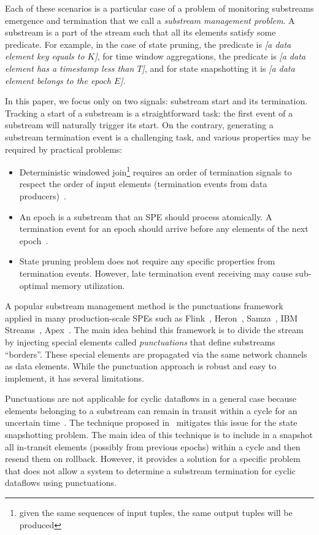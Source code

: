 Each of these scenarios is a particular case of a problem of monitoring substreams emergence and termination that we call a {\em substream management problem}. A substream is a part of the stream such that all its elements satisfy some predicate. 
For example, in the case of state pruning, the predicate is {\em [a data element key equals to $K$]}, for time window aggregations, the predicate is {\em [a data element has a timestamp less than $T$]}, and for state snapshotting it is {\em [a data element belongs to the epoch $E$]}.

In this paper, we focus only on two signals: substream start and its termination. Tracking a start of a substream is a straightforward task: the first event of a substream will naturally trigger its start. On the contrary, generating a substream termination event is a challenging task, and various properties may be required by practical problems:
\begin{itemize}
    \item Deterministic windowed join\footnote{given the same sequences of input tuples, the same output tuples will be produced} requires an order of termination signals to respect the order of input elements (termination events from data producers)~\cite{najdataei2019stretch, gulisano2016scalejoin}.
    \item An epoch is a substream that an SPE should process atomically. A termination event for an epoch should arrive before any elements of the next epoch~\cite{2015arXiv150608603C}.
    \item State pruning problem does not require any specific properties from termination events. However, late termination event receiving may cause sub-optimal memory utilization.
\end{itemize}

A popular substream management method is the punctuations framework~\cite{tucker2003exploiting} applied in many production-scale SPEs such as Flink~\cite{carbone2015apache}, Heron~\cite{Kulkarni:2015:THS:2723372.2742788}, Samza~\cite{Noghabi:2017:SSS:3137765.3137770}, IBM Streams~\cite{jacques2016consistent}, Apex~\cite{pathak2016introduction}. The main idea behind this framework is to divide the stream by injecting special elements called {\em punctuations} that define substreams ``borders''. These special elements are propagated via the same network channels as data elements. While the punctuation approach is robust and easy to implement, it has several limitations. 

Punctuations are not applicable for cyclic dataflows in a general case because elements belonging to a substream can remain in transit within a cycle for an uncertain time~\cite{carbone2018scalable}. The technique proposed in~\cite{Carbone:2017:SMA:3137765.3137777} mitigates this issue for the state snapshotting problem. The main idea of this technique is to include in a snapshot all in-transit elements (possibly from previous epochs) within a cycle and then resend them on rollback. However, it provides a solution for a specific problem that does not allow a system to determine a substream termination for cyclic dataflows using punctuations.

